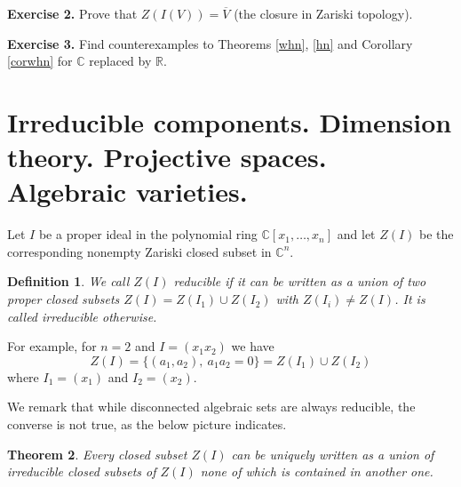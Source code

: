 \documentclass[11pt]{article}
\numberwithin{equation}{section}
\numberwithin{footnote}{section}
\newtheorem{thm}{Theorem}[section]
\newtheorem{defn}[thm]{Definition}
\newcommand{\blue}{\color{blue}}
\newcommand{\R}{{\mathbb R}}
\newcommand{\C}{{\mathbb C}}
\begin{document}
{\bf Exercise 2.} Prove that $Z(I(V)) = \overline V$ (the closure in Zariski topology).

{\bf Exercise 3.} Find counterexamples to Theorems \ref{whn}, \ref{hn} and Corollary \ref{corwhn} for $\C$ replaced by $\R$.



\section{Irreducible components. Dimension theory. Projective spaces. Algebraic varieties.}

Let $I$ be a proper ideal in the polynomial ring  $\C[x_1,\ldots,x_n]$ and let $Z(I)$ be the corresponding nonempty Zariski closed subset in $\C^n$. 

\smallskip
\begin{defn}
We call $Z(I)$ {\blue reducible} if it can be written as a union of two proper closed subsets $Z(I)= Z(I_1)\cup Z(I_2)$ with $Z(I_i)\neq Z(I)$. It is called {\blue irreducible} otherwise.
\end{defn}

For example, for $n=2$ and $I=(x_1x_2)$ we have 
$$Z(I) =\{(a_1,a_2), ~a_1a_2=0\} = Z(I_1) \cup Z(I_2)$$
where $I_1=(x_1)$ and $I_2=(x_2)$.

\smallskip
We remark that 
while disconnected algebraic sets are always reducible, the converse is not true, as the below picture indicates.





\smallskip
\begin{thm}
Every closed subset $Z(I)$ can be uniquely written as a union of irreducible closed subsets of $Z(I)$ none of which is contained in another one.
\end{thm}
\end{document}
